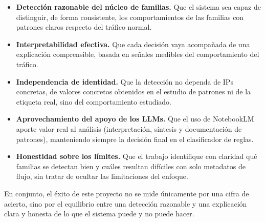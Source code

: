 \begin{itemize}
  \item \textbf{Detección razonable del núcleo de familias.} Que el sistema sea capaz de distinguir, de forma consistente, los comportamientos de las familias con patrones claros respecto del tráfico normal.
  \item \textbf{Interpretabilidad efectiva.} Que cada decisión vaya acompañada de una explicación comprensible, basada en señales medibles del comportamiento del tráfico.
  \item \textbf{Independencia de identidad.} Que la detección no dependa de IPs concretas, de valores concretos obtenidos en el estudio de patrones ni de la etiqueta real, sino del comportamiento estudiado.
  \item \textbf{Aprovechamiento del apoyo de los LLMs.} Que el uso de NotebookLM aporte valor real al análisis (interpretación, síntesis y documentación de patrones), manteniendo siempre la decisión final en el clasificador de reglas.
  \item \textbf{Honestidad sobre los límites.} Que el trabajo identifique con claridad qué familias se detectan bien y cuáles resultan difíciles con solo metadatos de flujo, sin tratar de ocultar las limitaciones del enfoque.
\end{itemize}

En conjunto, el éxito de este proyecto no se mide únicamente por una cifra de acierto, sino por el equilibrio entre una detección razonable y una explicación clara y honesta de lo que el sistema puede y no puede hacer.
